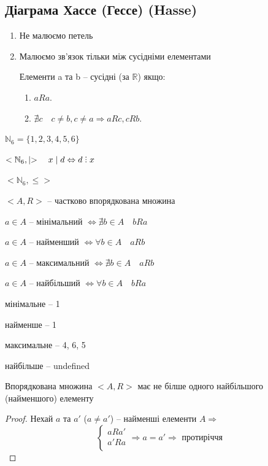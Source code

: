 \subsection{Діаграма Хассе (Гессе) (Hasse)}

\begin{enumerate}
    \item Не малюємо петель

    \item Малюємо зв'язок тільки між сусідніми елементами

    Елементи a та b -- сусідні (за $\mathbb{R}$) якщо:
    \begin{enumerate}
        \item $aRa$.
        \item $\nexists c \quad c \neq b, c \neq a \Rightarrow aRc, cRb$.
    \end{enumerate}
\end{enumerate}

\begin{example}
    $\mathbb{N}_6 = \{1, 2, 3, 4, 5, 6\}$

    $<\mathbb{N}_6, \mid> \quad x \mid d \Leftrightarrow d \divby x$
\end{example}

\begin{example}
    $<\mathbb{N}_6, \leqslant>$
    
    
\end{example}

$<A, R>$ -- частково впорядкована множина


$a \in A$ -- мінімальний $\Leftrightarrow \nexists b \in A \quad bRa$

$a \in A$ -- найменший $\Leftrightarrow \forall b \in A \quad aRb$

$a \in A$ -- максимальний $\Leftrightarrow \nexists b \in A \quad aRb$

$a \in A$ -- найбільший $\Leftrightarrow \forall b \in A \quad bRa$

\begin{example}
    

    мінімальне -- 1\par
    найменше -- 1\par
    максимальне -- 4, 6, 5\par
    найбільше -- undefined\par
\end{example}

\begin{claim}
    Впорядкована множина $<A, R>$
    має не білше одного найбільшого (найменшого)
    елементу
\end{claim}
\begin{proof}
    Нехай $a$ та $a'$ ($a \neq a'$) -- найменші елементи $A \Rightarrow$
    $$\left\{ \begin{array}{l}
        aRa' \\
        a'Ra \\
    \end{array} \right. \Rightarrow a = a' \Rightarrow \text{ протиріччя}$$
\end{proof}

